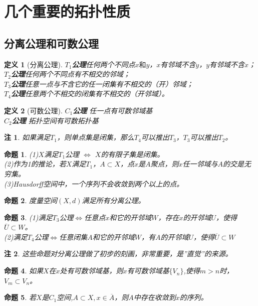 \documentclass[UTF8]{ctexart}
\newtheorem{dfnt}{定义}
\newtheorem*{note}{注}
\newtheorem{pro}{命题}
\begin{document}
\section{几个重要的拓扑性质}
\subsection{分离公理和可数公理}
\begin{dfnt}[分离公理]
 \textbf{$T_1$公理}\quad 任何两个不同点$x\mbox{和}y$，$x$有邻域不含$y$，$y$有邻域不含$x$；\\ \textbf{$T_2$公理}\quad 任何两个不同点有不相交的邻域；\\ \textbf{$T_3$公理}\quad 任意一点与不含它的任一闭集有不相交的（开）邻域；\\ \textbf{$T_4$公理}\quad 任意两个不相交的闭集有不相交的（开邻域）。
\end{dfnt}
\begin{dfnt}[可数公理]
 \textbf{$C_1$公理} \quad 任一点有可数邻域基 \\ \textbf{$C_2$公理} \quad 拓扑空间有可数拓扑基
\end{dfnt}
\begin{note}
如果满足$T_1$，则单点集是闭集，那么$T_4$可以推出$T_3$，$T_3$可以推出$T_2$。
\end{note}
\begin{pro}
(1)$X$满足$T_1$公理 $\Longleftrightarrow$ $X$的有限子集是闭集。\\(2)作为1的推论，若$X$满足$T_1$，$A \subset X$，点$x$是$A$聚点，则$x$任一邻域与$A$的交是无穷集。\\(3)Hausdorff空间中，一个序列不会收敛到两个以上的点。
\end{pro}
\begin{pro}
度量空间$(X,d)$满足所有分离公理。
\end{pro}
\begin{pro}
(1)满足$T_3$公理$\Longleftrightarrow$任意点$x$和它的开邻域$W$，存在$x$的开邻域$U$，使得$\overline{U} \subset W$。\\(2)满足$T_4$公理$\Longleftrightarrow$任意闭集$A$和它的开邻域$W$，有$A$的开邻域$U$，使得$\overline{U} \subset W$
\end{pro}
\begin{note}
这些命题对分离公理做了初步的刻画，非常重要，是''直觉''的来源。
\end{note}
\begin{pro}
如果$X$在$x$处有可数邻域基，则$x$有可数邻域基$\{V_n\}$,使得$m>n$时，$V_m \subset V_n$。
\end{pro}
\begin{pro}
若$X$是$C_1$空间,$A \subset X,x\in \overline{A}$，则$A$中存在收敛到$x$的序列。
\end{pro}
\end{document}

